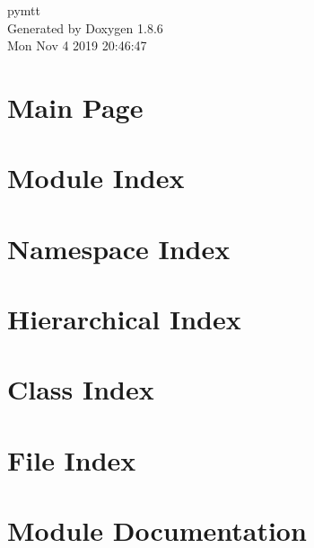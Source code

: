 \documentclass[twoside]{book}
\newcommand{\clearemptydoublepage}{%
  \newpage{\pagestyle{empty}\cleardoublepage}%
}
\begin{document}
\hypersetup{pageanchor=false}
\begin{titlepage}
\vspace*{7cm}
\begin{center}%
{\Large pymtt }\\
\vspace*{1cm}
{\large Generated by Doxygen 1.8.6}\\
\vspace*{0.5cm}
{\small Mon Nov 4 2019 20:46:47}\\
\end{center}
\end{titlepage}
\clearemptydoublepage
\tableofcontents
\clearemptydoublepage
{}
\hypersetup{pageanchor=true}

\chapter{Main Page}
\label{index}\hypertarget{index}{}
\chapter{Module Index}

\chapter{Namespace Index}

\chapter{Hierarchical Index}

\chapter{Class Index}

\chapter{File Index}

\chapter{Module Documentation}






















\end{document}

